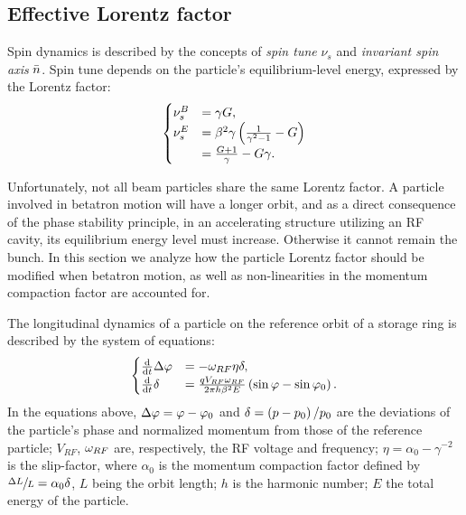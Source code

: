 \subsection{Effective Lorentz factor}\label{chpt1:FS-methods:effective-Lorentz-factor}
Spin dynamics is described by the concepts of \emph{spin tune} $\nu_s$ and \emph{invariant spin axis} $\bar n$.
Spin tune depends on the particle's  equilibrium-level energy, expressed by the Lorentz factor:
\begin{equation}\label{eq:spin_tune_vs_gamma}
  \begin{cases}
    \nu_s^B &= \gamma G, \\
    \nu_s^E &= \beta^2\gamma\bkt{\frac{1}{\gamma^2-1} - G} \\
            &= \frac{G+1}{\gamma} - G\gamma.
  \end{cases}
\end{equation}

Unfortunately, not all beam particles share the same Lorentz factor. A particle involved in betatron
motion will have a longer orbit, and as a direct consequence of the phase stability principle,
in an accelerating structure utilizing an RF cavity, its equilibrium energy level 
must increase. Otherwise it cannot remain the bunch. In this section we analyze how the particle Lorentz factor
should be modified when betatron motion, as well as non-linearities in the momentum compaction factor are
accounted for.

The longitudinal dynamics of a particle on the reference orbit of a storage ring is described
by the system of equations:
\begin{equation}
  \begin{cases}
    \ddt{}\D\varphi &= -\w_{RF}\eta\delta, \\
    \ddt{}\delta &= \frac{q V_{RF}\w_{RF}}{2\pi h\beta^2E}\bkt{\sin\varphi - \sin\varphi_0}.
  \end{cases}
\end{equation}
In the equations above, $\Delta\varphi = \varphi - \varphi_0$ and
$\delta = \bkt{p-p_0}/{p_0}$ are the deviations of the particle's phase and
normalized momentum from those of the reference particle;
$V_{RF}$, $\omega_{RF}$ are, respectively,
the RF voltage and frequency; $\eta = \alpha_0 - \gamma^{-2}$ is the slip-factor,
where $\alpha_0$ is the momentum compaction factor defined by $\sfrac{\Delta L}{L} = \alpha_0\delta$,
$L$ being the orbit length; $h$ is the harmonic number; $E$ the total energy of the particle.

